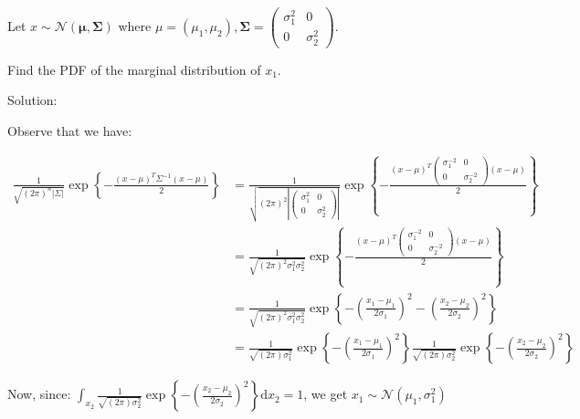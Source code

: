 \documentclass[11pt]{article}
\begin{document}
\begin{exercise} 
Let $x\sim\mathcal{N}(\boldsymbol{\mu},\boldsymbol{\Sigma})$ where $\mu = (\mu_1, \mu_2), \boldsymbol{\Sigma}=\left(\begin{array}{cc}
\sigma_{1}^{2} & 0\\
0 & \sigma_{2}^{2}
\end{array}\right)$.

Find the PDF of the marginal distribution of $x_1$.
\end{exercise}

Solution:

Observe that we have:

\begin{align*}
\frac{1}{\sqrt{\left(2\pi\right)^{n}\left|\Sigma\right|}}\exp\left\{ -\frac{\left(x-\mu\right)^{T}\Sigma^{-1}\left(x-\mu\right)}{2}\right\} &= \frac{1}{\sqrt{\left(2\pi\right)^{2}\left|\left(\begin{array}{cc}
\sigma_{1}^{2} & 0\\
0 & \sigma_{2}^{2}
\end{array}\right)\right|}}\exp\left\{ -\frac{\left(x-\mu\right)^{T}\left(\begin{array}{cc}
\sigma_{1}^{-2} & 0\\
0 & \sigma_{2}^{-2}
\end{array}\right)\left(x-\mu\right)}{2}\right\}\\& 
= \frac{1}{\sqrt{\left(2\pi\right)^{2}\sigma_{1}^{2}\sigma_{2}^{2}}}\exp\left\{ -\frac{\left(x-\mu\right)^{T}\left(\begin{array}{cc}
\sigma_{1}^{-2} & 0\\
0 & \sigma_{2}^{-2}
\end{array}\right)\left(x-\mu\right)}{2}\right\} \\&
= \frac{1}{\sqrt{\left(2\pi\right)^{2}\sigma_{1}^{2}\sigma_{2}^{2}}}\exp\left\{ -\left(\frac{x_{1}-\mu_{1}}{2\sigma_{1}}\right)^{2}-\left(\frac{x_{2}-\mu_{2}}{2\sigma_{2}}\right)^{2}\right\} \\&
=	\frac{1}{\sqrt{\left(2\pi\right)\sigma_{1}^{2}}}\exp\left\{ -\left(\frac{x_{1}-\mu_{1}}{2\sigma_{1}}\right)^{2}\right\} \frac{1}{\sqrt{\left(2\pi\right)\sigma_{2}^{2}}}\exp\left\{ -\left(\frac{x_{2}-\mu_{2}}{2\sigma_{2}}\right)^{2}\right\} 
\end{align*}

Now, since: $\int_{x_2}\frac{1}{\sqrt{\left(2\pi\right)\sigma_{2}^{2}}}\exp\left\{ -\left(\frac{x_{2}-\mu_{2}}{2\sigma_{2}}\right)^{2}\right\} 
\mathrm{d}x_2=1$, we get $x_1\sim\mathcal{N}({\mu_1},{\sigma_1^2})$
\\
\end{document}
